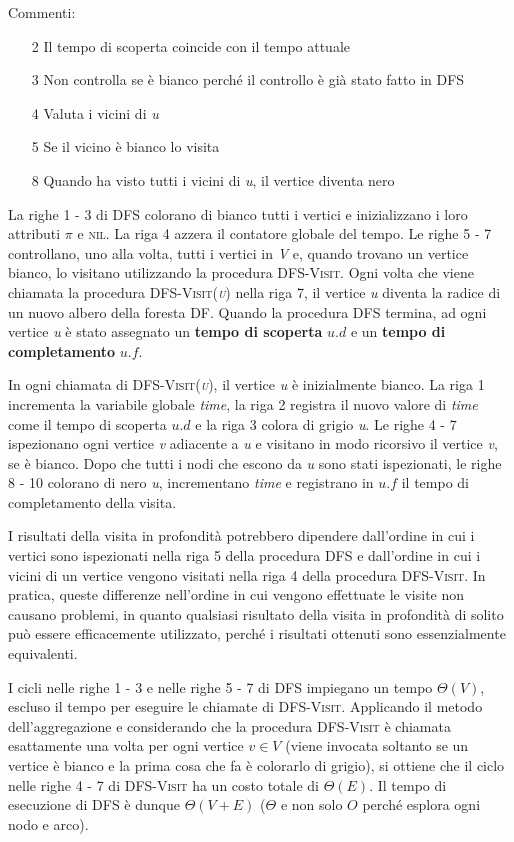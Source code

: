 \documentclass[10pt, a4paper]{report}
\begin{document}
Commenti:
\begin{enumerate}
\item[2]Il tempo di scoperta coincide con il tempo attuale
\item[3]Non controlla se è bianco perché il controllo è già stato fatto in \textsc{DFS}
\item[4]Valuta i vicini di \textit{u}
\item[5]Se il vicino è bianco lo visita
\item[8]Quando ha visto tutti i vicini di \textit{u}, il vertice diventa nero
\end{enumerate}
La righe 1 - 3 di \textsc{DFS} colorano di bianco tutti i vertici e inizializzano i loro attributi $\pi$ e \textsc{nil}. La riga 4 azzera il contatore globale del tempo. Le righe 5 - 7 controllano, uno alla volta, tutti i vertici in \textit{V} e, quando trovano un vertice bianco, lo visitano utilizzando la procedura \textsc{DFS-Visit}. Ogni volta che viene chiamata la procedura \textsc{DFS-Visit(\textit{u})} nella riga 7, il vertice \textit{u} diventa la radice di un nuovo albero della foresta DF. Quando la procedura \textsc{DFS} termina, ad ogni vertice \textit{u} è stato assegnato un \textbf{tempo di scoperta} $u.d$ e un \textbf{tempo di completamento} $u.f$.

In ogni chiamata di \textsc{DFS-Visit(\textit{u})}, il vertice \textit{u} è inizialmente bianco. La riga 1 incrementa la variabile globale \textit{time}, la riga 2 registra il nuovo valore di \textit{time} come il tempo di scoperta $u.d$ e la riga 3 colora di grigio \textit{u}. Le righe 4 - 7 ispezionano ogni vertice \textit{v} adiacente a \textit{u} e visitano in modo ricorsivo il vertice \textit{v}, se è bianco. Dopo che tutti i nodi che escono da \textit{u} sono stati ispezionati, le righe 8 - 10 colorano di nero \textit{u}, incrementano \textit{time} e registrano in $u.f$ il tempo di completamento della visita.

I risultati della visita in profondità potrebbero dipendere dall'ordine in cui i vertici sono ispezionati nella riga 5 della procedura \textsc{DFS} e dall'ordine in cui i vicini di un vertice vengono visitati nella riga 4 della procedura \textsc{DFS-Visit}. In pratica, queste differenze nell'ordine in cui vengono effettuate le visite non causano problemi, in quanto qualsiasi risultato della visita in profondità di solito può essere efficacemente utilizzato, perché i risultati ottenuti sono essenzialmente equivalenti.

I cicli nelle righe 1 - 3 e nelle righe 5 - 7 di \textsc{DFS} impiegano un tempo $\Theta(V)$, escluso il tempo per eseguire le chiamate di \textsc{DFS-Visit}. Applicando il metodo dell'aggregazione e considerando che la procedura \textsc{DFS-Visit} è chiamata esattamente una volta per ogni vertice $v \in V$ (viene invocata soltanto se un vertice è bianco e la prima cosa che fa è colorarlo di grigio), si ottiene che il ciclo nelle righe 4 - 7 di \textsc{DFS-Visit} ha un costo totale di $\Theta(E)$. Il tempo di esecuzione di \textsc{DFS} è dunque $\Theta(V + E)$ ($\Theta$ e non solo $O$ perché esplora ogni nodo e arco).
\end{document}
